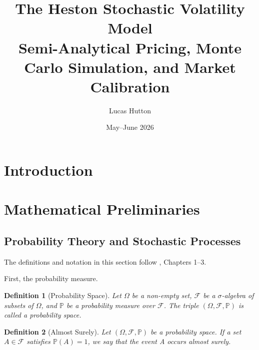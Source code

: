 \documentclass[11pt, a4paper]{article}
\title{\textbf{The Heston Stochastic Volatility Model}\\
       \large Semi-Analytical Pricing, Monte Carlo Simulation, and Market Calibration}
\author{Lucas Hutton}
\date{May--June 2026}
\newtheorem{definition}{Definition}
\numberwithin{equation}{subsection}
\numberwithin{definition}{subsection}
\numberwithin{theorem}{subsection}
\numberwithin{remark}{subsection}
\begin{document}
\maketitle
\tableofcontents
\newpage

\section{Introduction}


\section{Mathematical Preliminaries}

\subsection{Probability Theory and Stochastic Processes}

The definitions and notation in this section follow \textcite{shreve2004}, Chapters 1--3.

First, the probability measure.

\begin{definition}[Probability Space]
Let \(\Omega\) be a non-empty set, \(\mathcal{F}\) be a \(\sigma\)-algebra of subsets of \(\Omega\), and \(\mathbb{P}\) be a probability measure over \(\mathcal{F}\). The triple \((\Omega, \mathcal{F},\mathbb{P})\) is called a \textup{probability space}.
\end{definition}

\begin{definition}[Almost Surely]
Let \((\Omega, \mathcal{F},\mathbb{P})\) be a probability space. If a set \(A \in \mathcal{F}\) satisfies \(\mathbb{P}(A) = 1\), we say that the event A occurs \textup{almost surely}.
\end{definition}
\end{document}
